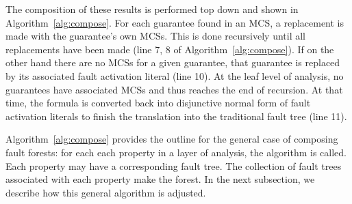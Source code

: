 The composition of these results is performed top down and shown in Algorithm~\ref{alg:compose}. For each guarantee found in an MCS, a replacement is made with the guarantee's own MCSs. This is done recursively until all replacements have been made (line 7, 8 of Algorithm~\ref{alg:compose}). If on the other hand there are no MCSs for a given guarantee, that guarantee is replaced by its associated fault activation literal (line 10). At the leaf level of analysis, no guarantees have associated MCSs and thus reaches the end of recursion. At that time, the formula is converted back into disjunctive normal form of fault activation literals to finish the translation into the traditional fault tree (line 11). 

Algorithm~\ref{alg:compose} provides the outline for the general case of composing fault forests: for each each property in a layer of analysis, the algorithm is called. Each property may have a corresponding fault tree. The collection of fault trees associated with each property make the forest. In the next subsection, we describe how this general algorithm is adjusted.

